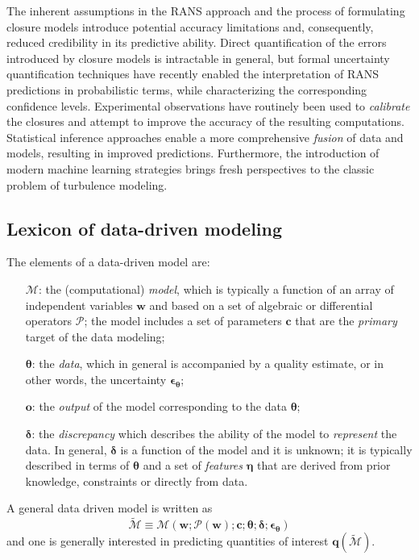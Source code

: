 \documentclass[a4paper]{ar-1col}
\begin{document}
The inherent assumptions in the RANS approach and the process of formulating closure models introduce potential 
accuracy limitations and, consequently, reduced credibility in  its predictive ability. Direct quantification of the errors 
introduced by closure models is intractable in general, but formal uncertainty quantification techniques have recently
enabled  the interpretation of RANS predictions in probabilistic terms, while characterizing the corresponding confidence levels.
Experimental observations have routinely been used  to {\it calibrate} the closures and attempt to improve the 
accuracy of the resulting computations.  Statistical inference approaches  enable a more comprehensive {\it fusion}
of data and models, resulting in improved predictions. Furthermore, the introduction of modern machine learning strategies
brings fresh perspectives to the classic problem of turbulence modeling. 

\begin{textbox}[h]
\section{Lexicon of data-driven modeling}
The elements of a data-driven model are:
\begin{itemize}
\item[$\mathcal{M}$:] the (computational) {\it model}, which is typically a function of an array of independent variables $\mathbf{w}$ and based on a set of algebraic or differential operators $\mathcal{P}$; the model  includes a set of parameters $\mathbf{c}$ that are the {\it primary} target of the data modeling;
\item[$\bm{\theta}$:]  the {\it data}, which in general is accompanied by a quality estimate, or in other words, the  uncertainty $\bm{\epsilon}_{\bm{\theta}}$;
\item[$\bm{o}$:] the {\it output} of the model corresponding to the data $\bm{\theta}$; 
\item[$\bm{\delta}$:] the {\it discrepancy} which describes the ability of the model to {\it represent} the data. In general, $\bm{\delta}$ is a function of the model and it is unknown; it is typically described in terms of $\bm{\theta}$ and a set of {\it features} $\bm{\eta}$ that are derived from prior knowledge, constraints or directly from data. 
\end{itemize}
A general data driven model is written as
\[
\widetilde{ \mathcal M} \equiv \mathcal M ( \mathbf{w};  \mathcal P(  \mathbf{w}  );  \mathbf{c}; \bm{\theta}; \bm{\delta};  \bm{\epsilon}_{\bm{\theta}} )
\]
and one is generally interested in predicting quantities of interest $\bm{q}(\widetilde{\mathcal M})$.



    

    

\end{textbox}
\end{document}
